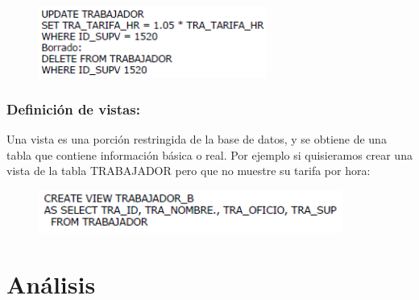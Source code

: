 \documentclass[preprint,12pt]{elsarticle}
\begin{document}
	\begin{figure}[htb]
		\begin{center}
			\includegraphics[width=7.5cm]{./IMAGENES/update}
		\end{center}
	\end{figure}

\subsubsection{\textbf{Definición de vistas:}}
Una vista es una porción restringida de la base de datos, y se obtiene de una tabla que contiene información básica o real. Por ejemplo si quisieramos crear una vista de la tabla TRABAJADOR pero que no muestre su tarifa por hora:

	\begin{figure}[htb]
		\begin{center}
			\includegraphics[width=10cm]{./IMAGENES/vistas1}
		\end{center}
	\end{figure}




\section{Análisis}



\end{document}
